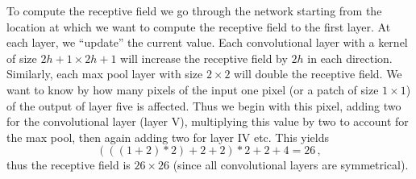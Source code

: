 To compute the receptive field we go through the network starting from the
location at which we want to compute the receptive field to the first layer.  At
each layer, we ``update'' the current value. Each convolutional layer with a
kernel of size $2h+1 \times 2h+1$ will increase the receptive field by $2h$ in
each direction.  Similarly, each max pool layer with size $2 \times 2$ will
double the receptive field. We want to know by how many pixels of the input one
pixel (or a patch of size $1 \times 1$) of the output of layer five is
affected. Thus we begin with this pixel, adding two for the convolutional layer
(layer V), multiplying this value by two to account for the max pool, then again
adding two for layer IV etc. This yields
\begin{equation*}
  (((1 + 2) * 2) + 2 + 2)*2 + 2 + 4 = 26\,,
\end{equation*}
thus the receptive field is $26 \times 26$ (since all convolutional layers are
symmetrical).

